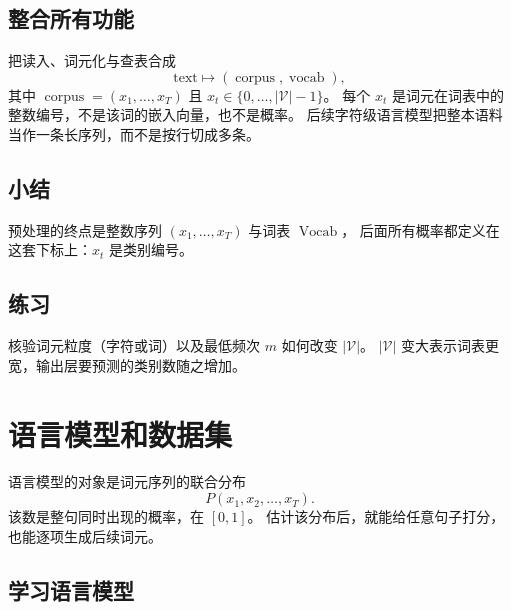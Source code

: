 \subsection{整合所有功能}

把读入、词元化与查表合成
\[
\text{text}
\longmapsto
(\operatorname{corpus},\operatorname{vocab}),
\]
其中 $\operatorname{corpus}=(x_1,\ldots,x_T)$ 且 $x_t\in\{0,\ldots,|\mathcal{V}|-1\}$。
每个 $x_t$ 是词元在词表中的整数编号，不是该词的嵌入向量，也不是概率。
后续字符级语言模型把整本语料当作一条长序列，而不是按行切成多条。

\subsection{小结}

预处理的终点是整数序列 $(x_1,\ldots,x_T)$ 与词表 $\operatorname{Vocab}$，
后面所有概率都定义在这套下标上：$x_t$ 是类别编号。

\subsection{练习}

核验词元粒度（字符或词）以及最低频次 $m$ 如何改变 $|\mathcal{V}|$。
$|\mathcal{V}|$ 变大表示词表更宽，输出层要预测的类别数随之增加。

\section{语言模型和数据集}



语言模型的对象是词元序列的联合分布
\[
P(x_1,x_2,\ldots,x_T).
\]
该数是整句同时出现的概率，在 $[0,1]$。
估计该分布后，就能给任意句子打分，也能逐项生成后续词元。

\subsection{学习语言模型}

